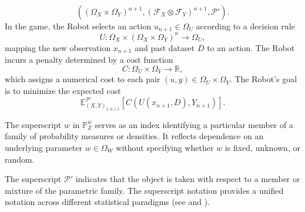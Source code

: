 \begin{definition}
	\begin{equation}
		((\Omega_X \times \Omega_Y)^{n+1}, (\mathcal{F}_X \otimes \mathcal{F}_Y)^{n+1}, \mathcal{P}').
	\end{equation}
	In the game, the Robot selects an action $u_{n+1} \in \Omega_U$ according to a decision rule
	\begin{equation}
		U \colon \Omega_X \times (\Omega_X \times \Omega_Y)^n \to \Omega_U,
	\end{equation}
	mapping the new observation $x_{n+1}$ and past dataset $D$ to an action. The Robot incurs a penalty determined by a cost function
	\begin{equation}
		C \colon \Omega_U \times \Omega_Y \to \mathbb{R},
	\end{equation}
	which assigns a numerical cost to each pair $(u,y) \in \Omega_U \times \Omega_Y$. The Robot's goal is to minimize the expected cost~\cite{murphy2023probabilistic}
	\begin{equation}
		\mathbb{E}_{(X,Y)_{1\colon n+1}}^{\mathcal{P}'}[C(U(x_{n+1},D), Y_{n+1})].
		\label{eq:expcost}
	\end{equation}
\end{definition}

\begin{remark}
	\label{rem:superscript_w}
	The superscript $w$ in $\mathbb{P}_Z^w$ serves as an index identifying a particular member of a family of probability measures or densities. It reflects dependence on an underlying parameter $w \in \Omega_W$ without specifying whether $w$ is fixed, unknown, or random.

	The superscript $\mathcal{P}'$ indicates that the object is taken with respect to a member or mixture of the parametric family. The superscript notation provides a unified notation across different statistical paradigms (see  and ).
\end{remark}


